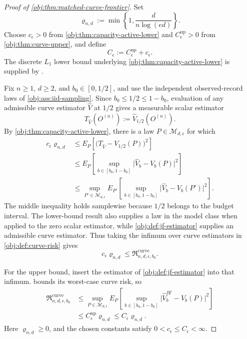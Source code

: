 \documentclass[11pt]{article}
\begin{document}
\begin{proof}[Proof of \cref{obj:thm:matched-curve-frontier}]
Set
\[
\varrho_{n,d}:=\min\left\{1,\frac{d}{n\log(ed)}\right\}.
\]
Choose \(c_\epsilon>0\) from \cref{obj:thm:capacity-active-lower} and \(C_\epsilon^{\mathrm{up}}>0\) from \cref{obj:thm:curve-upper}, and define
\[
C_\epsilon:=C_\epsilon^{\mathrm{up}}+c_\epsilon.
\]
The discrete \(L_1\) lower bound underlying \cref{obj:thm:capacity-active-lower} is supplied by \citep[Theorem 3 and the unknown-both-distributions reduction following Theorem 6]{JiaoHanWeissman2018}.

Fix \(n\ge1\), \(d\ge2\), and \(b_0\in[0,1/2]\), and use the independent observed-record laws of \cref{obj:ass:iid-sampling}. Since \(b_0\le1/2\le1-b_0\), evaluation of any admissible curve estimator \(\widehat V\) at \(1/2\) gives a measurable scalar estimator
\[
T_{\widehat V}(O^{(n)}):=\widehat V_{1/2}(O^{(n)}).
\]
By \cref{obj:thm:capacity-active-lower}, there is a law \(P\in\mathcal M_{d,\epsilon}\) for which
\[
\begin{aligned}
c_\epsilon\varrho_{n,d}
&\le E_P\!\left[\bigl(T_{\widehat V}-V_{1/2}(P)\bigr)^2\right]\\
&\le E_P\!\left[\sup_{b\in[b_0,1-b_0]}
       \bigl|\widehat V_b-V_b(P)\bigr|^2\right]\\
&\le \sup_{P'\in\mathcal M_{d,\epsilon}}
 E_{P'}\!\left[\sup_{b\in[b_0,1-b_0]}
       \bigl|\widehat V_b-V_b(P')\bigr|^2\right].
\end{aligned}
\]
The middle inequality holds samplewise because \(1/2\) belongs to the budget interval. The lower-bound result also supplies a law in the model class when applied to the zero scalar estimator, while \cref{obj:def:jf-estimator} supplies an admissible curve estimator. Thus taking the infimum over curve estimators in \cref{obj:def:curve-risk} gives
\[
c_\epsilon\varrho_{n,d}
\le \mathfrak R_{n,d,\epsilon,b_0}^{\mathrm{curve}}.
\]

For the upper bound, insert the estimator of \cref{obj:def:jf-estimator} into that infimum.  bounds its worst-case curve risk, so
\[
\begin{aligned}
\mathfrak R_{n,d,\epsilon,b_0}^{\mathrm{curve}}
&\le \sup_{P\in\mathcal M_{d,\epsilon}}
 E_P\!\left[\sup_{b\in[b_0,1-b_0]}
 \bigl|\widehat V_b^{\mathrm{JF}}-V_b(P)\bigr|^2\right]\\
&\le C_\epsilon^{\mathrm{up}}\varrho_{n,d}
 \le C_\epsilon\varrho_{n,d}.
\end{aligned}
\]
Here \(\varrho_{n,d}\ge0\), and the chosen constants satisfy \(0<c_\epsilon\le C_\epsilon<\infty\).


\end{proof}
\end{document}
